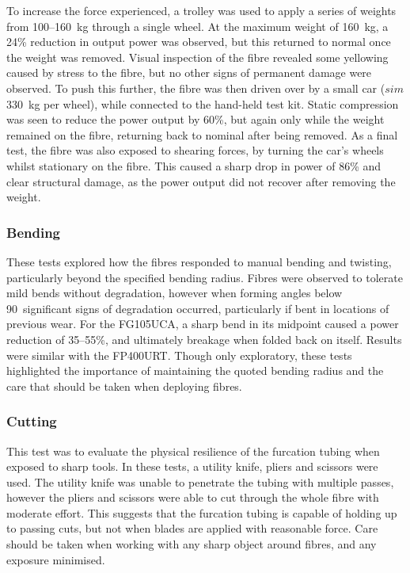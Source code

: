 \documentclass[a4paper,11pt]{article}
\let\oldsim\sim
\renewcommand{\sim}{{\oldsim}}
\providecommand{\DIFaddtex}[1]{{\protect\color{blue}\uwave{#1}}} %
\providecommand{\DIFdeltex}[1]{{\protect\color{red}\sout{#1}}}                      %
\providecommand{\DIFaddbegin}{} %
\providecommand{\DIFaddend}{} %
\providecommand{\DIFdelbegin}{} %
\providecommand{\DIFdelend}{} %
\providecommand{\DIFadd}[1]{\texorpdfstring{\DIFaddtex{#1}}{#1}} %
\providecommand{\DIFdel}[1]{\texorpdfstring{\DIFdeltex{#1}}{}} %
\newcommand{\DIFscaledelfig}{0.5}
\newlength{\DIFdelgraphicswidth} %
\newlength{\DIFdelgraphicsheight} %
\newcommand{\DIFaddincludegraphics}[2][]{{\color{blue}\fbox{\DIFOincludegraphics[#1]{#2}}}} %
\newcommand{\DIFdelincludegraphics}[2][]{%
\sbox{\DIFdelgraphicsbox}{\DIFOincludegraphics[#1]{#2}}%
\settoboxwidth{\DIFdelgraphicswidth}{\DIFdelgraphicsbox} %
\settoboxtotalheight{\DIFdelgraphicsheight}{\DIFdelgraphicsbox} %
\scalebox{\DIFscaledelfig}{%
\parbox[b]{\DIFdelgraphicswidth}{\usebox{\DIFdelgraphicsbox}\\[-\baselineskip] \rule{\DIFdelgraphicswidth}{0em}}\llap{\resizebox{\DIFdelgraphicswidth}{\DIFdelgraphicsheight}{%
\setlength{\unitlength}{\DIFdelgraphicswidth}%
\begin{picture}(1,1)%
\thicklines\linethickness{2pt} %
{\color[rgb]{1,0,0}\put(0,0){\framebox(1,1){}}}%
{\color[rgb]{1,0,0}\put(0,0){\line( 1,1){1}}}%
{\color[rgb]{1,0,0}\put(0,1){\line(1,-1){1}}}%
\end{picture}%
}\hspace*{3pt}}} %
} %
\DeclareRobustCommand{\DIFaddbegin}{\DIFOaddbegin \let\includegraphics\DIFaddincludegraphics} %
\DeclareRobustCommand{\DIFaddend}{\DIFOaddend \let\includegraphics\DIFOincludegraphics} %
\DeclareRobustCommand{\DIFdelbegin}{\DIFOdelbegin \let\includegraphics\DIFdelincludegraphics} %
\DeclareRobustCommand{\DIFdelend}{\DIFOaddend \let\includegraphics\DIFOincludegraphics} %
\begin{document}
To increase the force experienced, a trolley was used to apply a series of weights from 100--160~kg through a single wheel. At the maximum weight of 160~kg, a 24\% reduction in output power was observed, but this returned to normal once the weight was removed. Visual inspection of the fibre revealed some yellowing caused by stress to the fibre, but no other signs of permanent damage were observed. To push this further, the fibre was then driven over by a small car (\DIFdelbegin \DIFdel{$sim$}\DIFdelend \DIFaddbegin \DIFadd{$\sim$}\DIFaddend 330~kg per wheel), while connected to the hand-held test kit. Static compression was seen to reduce the power output by 60\%, but again only while the weight remained on the fibre, returning back to nominal after being removed. As a final test, the fibre was also exposed to shearing forces, by turning the car's wheels whilst stationary on the fibre. This caused a sharp drop in power of 86\% and clear structural damage, as the power output did not recover after removing the weight.

\subsubsection{Bending}
These tests explored how the fibres responded to manual bending and twisting, particularly beyond the specified bending radius. Fibres were observed to tolerate mild bends without degradation, however when forming angles below 90\degree\ significant signs of degradation occurred, particularly if bent in locations of previous wear. For the FG105UCA, a sharp bend in its midpoint caused a power reduction of 35--55\%, and ultimately breakage when folded back on itself. Results were similar with the FP400URT. Though only exploratory, these tests highlighted the importance of maintaining the quoted bending radius and the care that should be taken when deploying fibres.

\subsubsection{Cutting}
This test was to evaluate the physical resilience of the furcation tubing when exposed to sharp tools. In these tests, a utility knife, pliers and scissors were used. The utility knife was unable to penetrate the tubing with multiple passes, however the pliers and scissors were able to cut through the whole fibre with moderate effort. This suggests that the furcation tubing is capable of holding up to passing cuts, but not when blades are applied with reasonable force. Care should be taken when working with any sharp object around fibres, and any exposure minimised.
\end{document}
